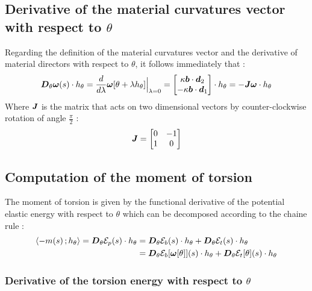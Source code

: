 \subsection{Derivative of the material curvatures vector with respect to $\theta$}
Regarding the definition of the material curvatures vector and the derivative of material directors with respect to $\theta$, it follows immediately that :
\begin{equation}
			\boldsymbol{D}_\theta\boldsymbol{\omega}(s)\cdot h_\theta
	= \frac{d}{d\lambda} \boldsymbol{\omega}[\theta + \lambda h_\theta]\Bigr|_{\lambda = 0}
	= \begin{bmatrix}
		\kappa\boldsymbol{b}\cdot\boldsymbol{d}_2\\
		-\kappa\boldsymbol{b}\cdot\boldsymbol{d}_1\\
	\end{bmatrix}\cdot h_\theta
	= - \boldsymbol{\mathit{J}}\boldsymbol{\omega}\cdot h_\theta\\
\end{equation}
Where $\boldsymbol{\mathit{J}}$ is the matrix that acts on
two dimensional vectors by counter-clockwise rotation of angle $\frac{\pi}{2}$ :
\begin{equation}
	\boldsymbol{\mathit{J}} = \begin{bmatrix}
			0	&	-1\\
			1	&	0\\
		\end{bmatrix}
\end{equation}

\subsection{Computation of the moment of torsion}

The moment of torsion is given by the functional derivative of the potential elastic energy with respect to $\theta$ which can be decomposed according to the chaine rule :
\begin{equation}
	\begin{aligned}
	\langle -m(s)\,; h_\theta\rangle = \boldsymbol{D}_\theta\mathcal{E}_p(s)\cdot h_\theta
	&= \boldsymbol{D}_\theta\mathcal{E}_b(s)\cdot h_\theta + \boldsymbol{D}_\theta\mathcal{E}_t(s)\cdot h_\theta \\
	&= \boldsymbol{D}_\theta\mathcal{E}_b[\boldsymbol{\omega}[\theta]](s)\cdot h_\theta + \boldsymbol{D}_\theta\mathcal{E}_t[\theta](s)\cdot h_\theta \\
	\end{aligned}
\end{equation}

\subsubsection{Derivative of the torsion energy with respect to $\theta$}

